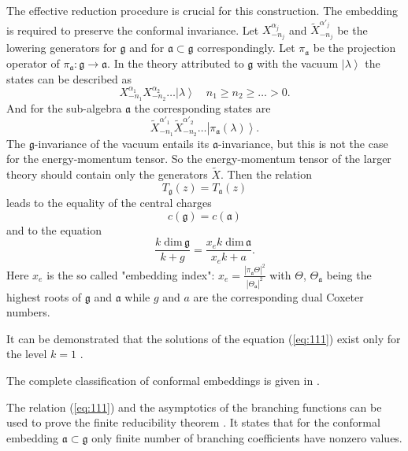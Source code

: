 \documentclass[12pt]{iopart}
\theoremstyle{definition}
\newcommand{\af}{\mathfrak{a}}
\begin{document}
The effective reduction procedure is crucial for this construction.
The embedding is required to preserve the conformal invariance.
Let $X^{\alpha_j}_{-n_j}$ and $\tilde{X}^{\alpha'_j}_{-n_j}$ be the lowering generators for
$\mathfrak{g}$ and for $\af\subset\mathfrak{g}$ correspondingly.
Let $\pi_{\af}$ be the projection operator of
$\pi_{\af}:\mathfrak{g}\longrightarrow \af$.
In the theory attributed to $\mathfrak{g}$ with the vacuum $\left|\lambda\right>$
the states can be described as
\begin{equation*}
  \label{eq:109}
  X^{\alpha_1}_{-n_1}X^{\alpha_2}_{-n_2}\dots\left|\lambda\right>\quad n_1\geq n_2\geq \dots>0.
\end{equation*}
And for the sub-algebra $\af$ the corresponding states are
\begin{equation*}
  \label{eq:110}
  \tilde{X}^{\alpha'_1}_{-n_1}\tilde{X}^{\alpha'_2}_{-n_2}\dots\left|\pi_{\af}(\lambda)\right>.
\end{equation*}
The $\mathfrak{g}$-invariance of the vacuum entails its $\af$-invariance,
but this is not the case for the energy-momentum tensor. So the energy-momentum tensor of the larger theory
should contain only the generators $\tilde{X}$. Then the relation
\begin{equation}
  \label{eq:2}
  T_{\mathfrak{g}}(z)=T_{\af}(z)
\end{equation}
leads to the equality of the central charges
\begin{equation*}
  \label{eq:33}
  c(\mathfrak{g})=c(\af)
\end{equation*}
and to the equation
\begin{equation}
  \label{eq:111}
  \frac{k\;\mathrm{dim}\,\mathfrak{g}}{k+g}=\frac{x_e k\; \mathrm{dim}\,\af}{x_ek+a}.
\end{equation}
Here $x_e$ is the so called "embedding index":
$x_e=\frac{\left|\pi_{\mathfrak{a}} \Theta\right|^2}{\left|\Theta_{\mathfrak{a}}\right|^2}$
with $\Theta$, $\Theta_{\mathfrak{a}}$ being the highest roots of
$\mathfrak{g}$ and $\mathfrak{a}$
while $g$  and $a$ are the  corresponding dual Coxeter numbers.

It can be demonstrated that the solutions of the equation (\ref{eq:111}) exist only
for the level $k=1$ \cite{difrancesco1997cft}.

The complete classification of conformal embeddings is given in \cite{schellekens1986conformal}.

The relation (\ref{eq:111}) and the asymptotics of the branching functions can be used
to prove the finite reducibility theorem \cite{kac1988modular}.
It states that for the conformal embedding  $\af\subset\mathfrak{g}$
only finite number of branching coefficients have nonzero values.
\end{document}
